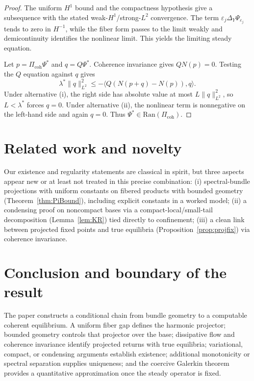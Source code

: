 \documentclass[11pt]{article}
\providecommand{\PiCoh}{\Pi_{\mathrm{coh}}}
\providecommand{\Qop}{Q}
\providecommand{\Ran}{\mathrm{Ran}}
\providecommand{\lamstar}{\ensuremath{\lambda^{\ast}}}
\begin{document}
\begin{proof}
The uniform $H^1$ bound and the compactness hypothesis give a subsequence with
the stated weak-$H^1$/strong-$L^2$ convergence. The term
$\varepsilon_j\Delta_Y\Psi_{\varepsilon_j}$ tends to zero in $H^{-1}$,
while the fiber form passes to the limit weakly and demicontinuity identifies
the nonlinear limit. This yields the limiting steady equation.

Let $p=\PiCoh\Psi^\ast$ and $q=\Qop\Psi^\ast$. Coherence invariance gives
$\Qop N(p)=0$. Testing the $\Qop$ equation against $q$ gives
\[
\lamstar\|q\|_{L^2}^2
\le -\langle \Qop(N(p+q)-N(p)),q\rangle.
\]
Under alternative (i), the right side has absolute value at most
$L\|q\|_{L^2}^2$, so $L<\lamstar$ forces $q=0$. Under alternative (ii),
the nonlinear term is nonnegative on the left-hand side and again $q=0$.
Thus $\Psi^\ast\in\Ran(\PiCoh)$.
\end{proof}

\section{Related work and novelty}

Our existence and regularity statements are classical in spirit, but three aspects appear new or at least not treated in this precise combination:
(i) spectral-bundle projections with uniform constants on fibered products with bounded geometry (Theorem~\ref{thm:PiBound}), including explicit constants in a worked model;
(ii) a condensing proof on noncompact bases via a compact-local/small-tail decomposition (Lemma~\ref{lem:KR}) tied directly to confinement;
(iii) a clean link between projected fixed points and true equilibria (Proposition~\ref{prop:projfix}) via coherence invariance.

\section{Conclusion and boundary of the result}

The paper constructs a conditional chain from bundle geometry to a computable
coherent equilibrium.  A uniform fiber gap defines the harmonic projector;
bounded geometry controls that projector over the base; dissipative flow and
coherence invariance identify projected returns with true equilibria;
variational, compact, or condensing arguments establish existence; additional
monotonicity or spectral separation supplies uniqueness; and the coercive
Galerkin theorem provides a quantitative approximation once the steady
operator is fixed.
\end{document}
